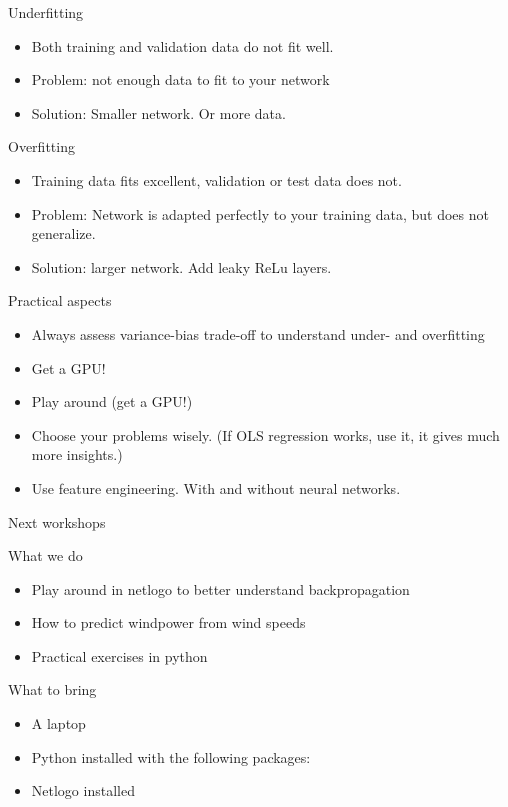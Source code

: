 \documentclass[color=usenames,dvipsnames]{beamer}
\begin{document}
\begin{frame}{Underfitting}

\begin{itemize}
	\item Both training and validation data do not fit well.
	\item Problem: not enough data to fit to your network
	\item Solution: Smaller network. Or more data.
\end{itemize}

\end{frame}




\begin{frame}{Overfitting}

\begin{itemize}
	\item Training data fits excellent, validation or test data does not. 
	\item Problem: Network is adapted perfectly to your training data, but does not generalize.
	\item Solution: larger network. Add leaky ReLu layers. 
\end{itemize}

\end{frame}


\begin{frame}{Practical aspects} 

\begin{itemize}
	\item Always assess variance-bias trade-off to understand under- and overfitting
	\item Get a GPU!
	\item Play around (get a GPU!)
	\item Choose your problems wisely. (If OLS regression works, use it, it gives much more insights.)
	\item Use feature engineering. With and without neural networks.
\end{itemize}

\end{frame}

\begin{frame}{Next workshops} 

What we do
\begin{itemize}
	\item Play around in netlogo to better understand backpropagation
	\item How to predict windpower from wind speeds
	\item Practical exercises in python
\end{itemize}

What to bring
\begin{itemize}
	\item A laptop
	\item Python installed with the following packages:
	\item Netlogo installed
\end{itemize}

\end{frame}
\end{document}
